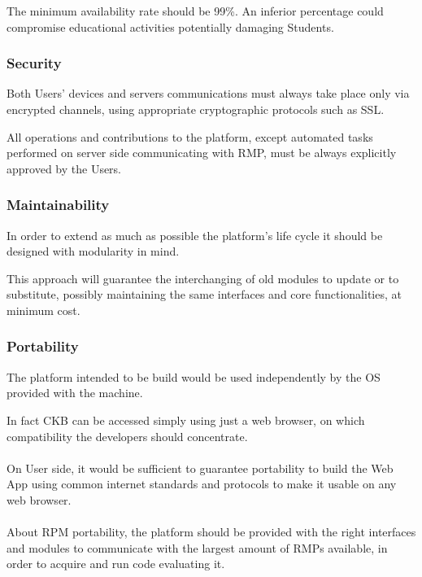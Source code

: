 The minimum availability rate should be 99\%. An inferior percentage could compromise educational activities potentially damaging Students.

\subsubsection{Security}
Both Users' devices and servers communications must always take place only via encrypted channels, using appropriate cryptographic protocols such as SSL. 

All operations and contributions to the platform, except automated tasks performed on server side communicating with RMP, must be always explicitly approved by the Users.

\subsubsection{Maintainability}
In order to extend as much as possible the platform's life cycle it should be designed with modularity in mind. 

This approach will guarantee the interchanging of old modules to update or to substitute, possibly maintaining the same interfaces and core functionalities, at minimum cost.

\subsubsection{Portability}
The platform intended to be build would be used independently by the OS provided with the machine. 

In fact CKB can be accessed simply using just a web browser, on which compatibility the developers should concentrate.\\ 
\\
On User side, it would be sufficient to guarantee portability to build the Web App using common internet standards and protocols to make it usable on any web browser.\\
\\
About RPM portability, the platform should be provided with the right interfaces and modules to communicate with the largest amount of RMPs available, in order to acquire and run code evaluating it.